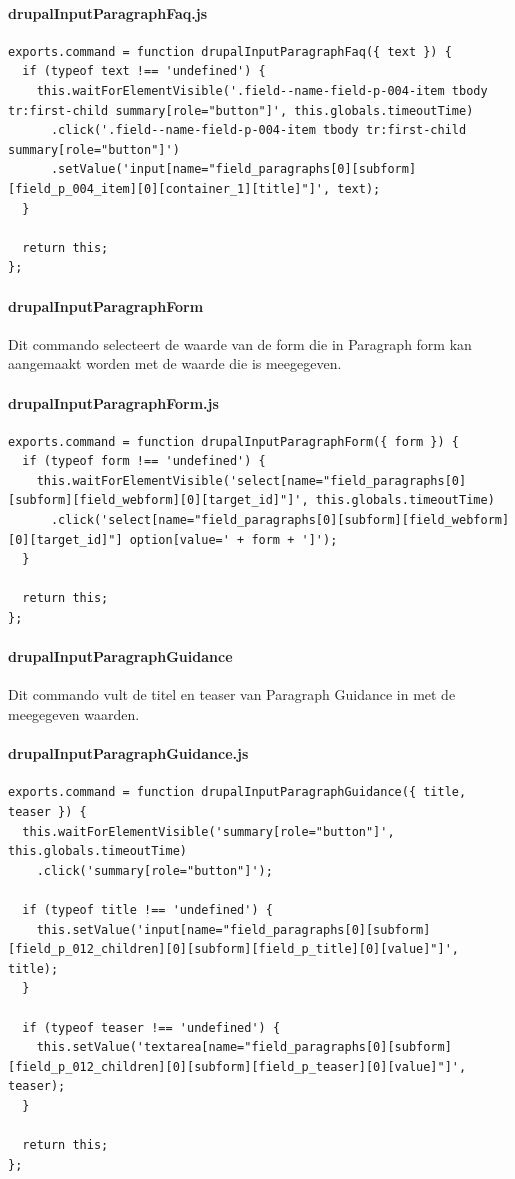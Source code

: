 \paragraph{drupalInputParagraphFaq.js}
\begin{lstlisting}[breaklines=true]
exports.command = function drupalInputParagraphFaq({ text }) {
  if (typeof text !== 'undefined') {
    this.waitForElementVisible('.field--name-field-p-004-item tbody tr:first-child summary[role="button"]', this.globals.timeoutTime)
      .click('.field--name-field-p-004-item tbody tr:first-child summary[role="button"]')
      .setValue('input[name="field_paragraphs[0][subform][field_p_004_item][0][container_1][title]"]', text);
  }

  return this;
};
\end{lstlisting}


\clearpage
\paragraph{drupalInputParagraphForm}
\label{commando18}
Dit commando selecteert de waarde van de form die in Paragraph form kan aangemaakt worden met de waarde die is meegegeven.
\paragraph{drupalInputParagraphForm.js}
\begin{lstlisting}[breaklines=true]
exports.command = function drupalInputParagraphForm({ form }) {
  if (typeof form !== 'undefined') {
    this.waitForElementVisible('select[name="field_paragraphs[0][subform][field_webform][0][target_id]"]', this.globals.timeoutTime)
      .click('select[name="field_paragraphs[0][subform][field_webform][0][target_id]"] option[value=' + form + ']');
  }

  return this;
};
\end{lstlisting}


\clearpage
\paragraph{drupalInputParagraphGuidance}
\label{commando19}
Dit commando vult de titel en teaser van Paragraph Guidance in met de meegegeven waarden.
\paragraph{drupalInputParagraphGuidance.js}
\begin{lstlisting}[breaklines=true]
exports.command = function drupalInputParagraphGuidance({ title, teaser }) {
  this.waitForElementVisible('summary[role="button"]', this.globals.timeoutTime)
    .click('summary[role="button"]');

  if (typeof title !== 'undefined') {
    this.setValue('input[name="field_paragraphs[0][subform][field_p_012_children][0][subform][field_p_title][0][value]"]', title);
  }

  if (typeof teaser !== 'undefined') {
    this.setValue('textarea[name="field_paragraphs[0][subform][field_p_012_children][0][subform][field_p_teaser][0][value]"]', teaser);
  }

  return this;
};
\end{lstlisting}


